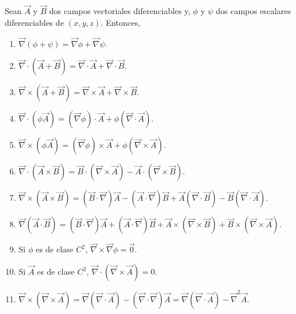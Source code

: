 \begin{teorema} \label{Prop-Op-Vect}
Sean $\Vec{A}$ y $\Vec{B}$ dos campos vectoriales diferenciables y, $\phi$ y $\psi$ dos campos escalares diferenciables de $(x,y,z)$. Entonces,
\begin{enumerate}
    \item $\Vec{\nabla}(\phi + \psi) = \Vec{\nabla} \phi + \Vec{\nabla} \psi$.

    \item $\Vec{\nabla} \cdot (\vec{A} + \Vec{B}) = \Vec{\nabla} \cdot \Vec{A} + \Vec{\nabla} \cdot \Vec{B}$.

    \item $\Vec{\nabla} \times (\vec{A} + \Vec{B} ) = \Vec{\nabla} \times \Vec{A} + \Vec{\nabla} \times \Vec{B}$.

    \item $\Vec{\nabla} \cdot (\phi \Vec{A}) = (\Vec{\nabla} \phi) \cdot \Vec{A} + \phi (\Vec{\nabla} \cdot \Vec{A})$.

    \item $\Vec{\nabla} \times (\phi \Vec{A}) = (\Vec{\nabla} \phi) \times \Vec{A} + \phi(\Vec{\nabla} \times \Vec{A})$.

    \item $\Vec{\nabla} \cdot (\Vec{A} \times \Vec{B}) = \Vec{B} \cdot (\Vec{\nabla} \times \Vec{A}) - \Vec{A} \cdot (\Vec{\nabla} \times \Vec{B})$.

    \item $\Vec{\nabla} \times (\Vec{A} \times \Vec{B}) = (\Vec{B} \cdot \Vec{\nabla}) \Vec{A} - (\Vec{A} \cdot  \Vec{\nabla}) \Vec{B} + \Vec{A}( \Vec{\nabla} \cdot \Vec{B}) - \Vec{B}( \Vec{\nabla} \cdot \Vec{A})$.

    \item $ \Vec{\nabla}(\Vec{A} \cdot \Vec{B}) = (\Vec{B}  \cdot \Vec{\nabla}) \Vec{A} + (\Vec{A} \cdot  \Vec{\nabla}) \Vec{B} + \Vec{A} \times ( \Vec{\nabla} \times \Vec{B}) + \Vec{B} \times ( \Vec{\nabla} \times \Vec{A})$.

    \item Si $\phi$ es de clase $C^2$, $\vec{\nabla} \times  \Vec{\nabla} \phi = \Vec{0}$.

    \item Si $\Vec{A}$ es de clase $C^2$, $\vec{\nabla} \cdot  (\Vec{\nabla} \times \Vec{A}) = 0$.

    \item $\Vec{\nabla} \times (\Vec{\nabla} \times \Vec{A}) = \Vec{\nabla} (\Vec{\nabla} \cdot \Vec{A}) - (\Vec{\nabla} \cdot \Vec{\nabla}) \Vec{A} = \Vec{\nabla}(\Vec{\nabla} \cdot \Vec{A}) - \Vec{\nabla}^2 \Vec{A}$.
\end{enumerate}
\end{teorema}

